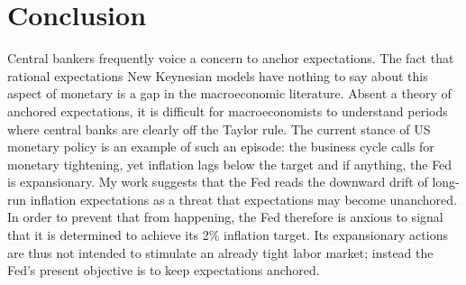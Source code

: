 \documentclass[11pt]{article}
\renewcommand{\[}{\begin{equation}}
\renewcommand{\]}{\end{equation}}
\begin{document}
%
%


\section{Conclusion}\label{conclusion}
Central bankers frequently voice a concern to anchor expectations. The fact that rational expectations New Keynesian models have nothing to say about this aspect of monetary is a gap in the macroeconomic literature. Absent a theory of anchored expectations, it is difficult for macroeconomists to understand periods where central banks are clearly off the Taylor rule. The current stance of US monetary policy is an example of such an episode: the business cycle calls for monetary tightening, yet inflation lags below the target and if anything, the Fed is expansionary. My work suggests that the Fed reads the downward drift of long-run inflation expectations as a threat that expectations may become unanchored. In order to prevent that from happening, the Fed therefore is anxious to signal that it is determined to achieve its 2\% inflation target. Its expansionary actions are thus not intended to stimulate an already tight labor market; instead the Fed's present objective is to keep expectations anchored. 
\end{document}
